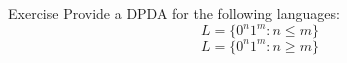 \documentclass{prosper}%
\newcommand{\e} {{\mbox{$\epsilon$}}}
\newcommand{\cavd}[1]{{\mbox{$\;\overset{_*}{\underset{_#1}{\vdash}}\;$}}}
\begin{document}
\begin{comment}
\begin{slide}{RLs and deterministic PDA}%
L(DPDA) includes all RLs.
\begin{description}
\item[Theorem:] If $R$ is regular, then $R = L(P )$ for some DPDA $P$.
\item[Proof:] Since R is regular there is a DFA $A$ such that
$R = L(A)$. Let 
\[
A = ({\blue Q},{\blue \Sigma},\delta_A,{\blue q_0},{\blue F})
\]
 We define the DPDA
 \[
P = ({\blue Q},{\blue \Sigma},\{Z_0\},\delta_P,{\blue q_0},Z_0,{\blue F}),
\]
where $\delta_P (q, a, Z_0) = \{(\delta_A(q, a), Z_0)\}$,  for all $p,q\in Q$, and $a\in\Sigma$.

With a simple induction on $|w|$ one can show
\[(q ,w,Z )\cavd{P }(p,\e,Z )\mbox{\bf\blue\ iff\ }\hat{\delta_A}(q ,w)=p
\]
\end{description}
\end{slide}

\begin{slide}{$L(DPDA)$: the language of DPDA (cnt.)}
\begin{itemize}
\item We have seen that $RL\subseteq  L(DPDA)$
\item Also, it is easy to see that  $L_{wcw^R}\in L(DPDA)-RL$. Hint: we use the PL to show that $L_{wcw^R}$ is not regular.
\item There are CFL that are not in L(DPDA), e.g., $L_{ww^R}$.
\item The proof that $L_{ww^R} \not\in L(DPDA)$ is complex, but its intuition is transparent.
\begin{itemize}
\item Suppose $P$ is a DPDA that accepts $L_{ww^R}$ and $w=0^n110^n0^n110^n$.
\item To recognize $w$, $P$ would have to use the stack to count the 0's, emptying its stack to recognize the second sequence of 0's.
\item if  it sees next an identical string, it must accept.
\item However, since its stack is empty, it cannot remember what $n$ was.
\end{itemize}
\end{itemize}
\end{slide}
\end{comment}

\begin{slide}{Exercise}
Provide a DPDA for the following languages:
\[
L=\{0^n1^m: n\leq m\}
\]
\[
L=\{0^n1^m:n\geq m\}
\]
\end{slide}
\end{document}
